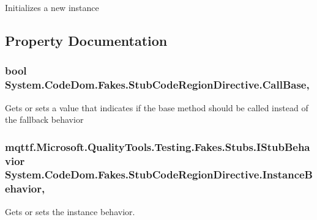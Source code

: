 Initializes a new instance



\subsection{Property Documentation}
\hypertarget{class_system_1_1_code_dom_1_1_fakes_1_1_stub_code_region_directive_a03d85b73a8414946951a02d4dafb0a9f}{
\subsubsection[{Call\-Base}]{\setlength{\rightskip}{0pt plus 5cm}bool System.\-Code\-Dom.\-Fakes.\-Stub\-Code\-Region\-Directive.\-Call\-Base\hspace{0.3cm}{\ttfamily [get]}, {\ttfamily [set]}}}\label{class_system_1_1_code_dom_1_1_fakes_1_1_stub_code_region_directive_a03d85b73a8414946951a02d4dafb0a9f}


Gets or sets a value that indicates if the base method should be called instead of the fallback behavior

\hypertarget{class_system_1_1_code_dom_1_1_fakes_1_1_stub_code_region_directive_af43a4d9cc37a9dc85cdaf5c2a505ccdb}{
\subsubsection[{Instance\-Behavior}]{\setlength{\rightskip}{0pt plus 5cm}mqttf.\-Microsoft.\-Quality\-Tools.\-Testing.\-Fakes.\-Stubs.\-I\-Stub\-Behavior System.\-Code\-Dom.\-Fakes.\-Stub\-Code\-Region\-Directive.\-Instance\-Behavior\hspace{0.3cm}{\ttfamily [get]}, {\ttfamily [set]}}}\label{class_system_1_1_code_dom_1_1_fakes_1_1_stub_code_region_directive_af43a4d9cc37a9dc85cdaf5c2a505ccdb}


Gets or sets the instance behavior.

